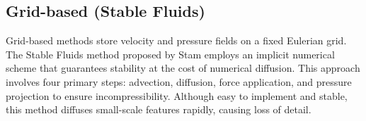 \subsection{Grid-based (Stable Fluids)}
Grid-based methods store velocity and pressure fields on a fixed Eulerian grid.
The Stable Fluids method proposed by Stam \citep{stam2023stable} employs an implicit numerical scheme that guarantees stability at the cost of numerical diffusion.
This approach involves four primary steps: advection, diffusion, force application, and pressure projection to ensure incompressibility.
Although easy to implement and stable, this method diffuses small-scale features rapidly, causing loss of detail.

